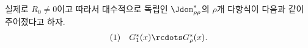 
실제로 $R_0\ne0$이고 따라서 대수적으로 독립인 $\Jdom^*_{\rho\rho}$의 $\rho$개 다항식이 다음과 같이 주어졌다고 하자.
\[
\begin{array}{@{}l@{\quad}c@{}}
(1)& G_1^*(x)\rcdots G_\rho^*(x).
\end{array}
\]
